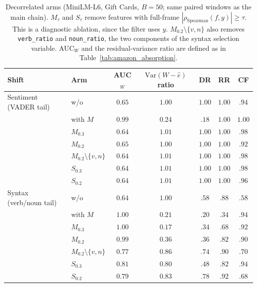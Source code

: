 \documentclass[11pt]{article}
\begin{document}
\begin{table}[ht]
\centering
\caption{Decorrelated arms (MiniLM-L6, Gift Cards, $B{=}50$; same paired windows as the main chain).
$M_\tau$ and $S_\tau$ remove features with full-frame $|\rho_{\mathrm{Spearman}}(f,y)|\ge\tau$.
This is a diagnostic ablation, since the filter uses $y$.
$M_{0.2}\setminus\{v,n\}$ also removes \texttt{verb\_ratio} and \texttt{noun\_ratio}, the two components of
the syntax selection variable. AUC$_W$ and the residual-variance ratio are defined as in
Table~\ref{tab:amazon_absorption}.}
\label{tab:amazon_decorr}
\begin{tabular}{llccccc}
\toprule
Shift & Arm & AUC$_W$ & $\mathrm{Var}(W-\hat e)$ ratio & DR & RR & CF \\
\midrule
Sentiment (VADER tail) & w/o & $0.65$ & $1.00$ & $\mathbf{1.00}$ & $\mathbf{1.00}$ & $\mathbf{.94}$ \\
 & with $M$ & $0.99$ & $0.24$ & $.18$ & $\mathbf{1.00}$ & $\mathbf{1.00}$ \\
 & $M_{0.3}$ & $0.64$ & $1.01$ & $\mathbf{1.00}$ & $\mathbf{1.00}$ & $\mathbf{.98}$ \\
 & $M_{0.2}$ & $0.65$ & $1.00$ & $\mathbf{1.00}$ & $\mathbf{1.00}$ & $\mathbf{.92}$ \\
 & $M_{0.2}\setminus\{v,n\}$ & $0.64$ & $1.01$ & $\mathbf{1.00}$ & $\mathbf{1.00}$ & $\mathbf{.98}$ \\
 & $S_{0.3}$ & $0.64$ & $1.01$ & $\mathbf{1.00}$ & $\mathbf{1.00}$ & $\mathbf{.98}$ \\
 & $S_{0.2}$ & $0.64$ & $1.01$ & $\mathbf{1.00}$ & $\mathbf{1.00}$ & $\mathbf{.96}$ \\
\midrule
Syntax (verb/noun tail) & w/o & $0.64$ & $1.00$ & $.58$ & $\mathbf{.88}$ & $.58$ \\
 & with $M$ & $1.00$ & $0.21$ & $.20$ & $.34$ & $\mathbf{.94}$ \\
 & $M_{0.3}$ & $1.00$ & $0.17$ & $.34$ & $.68$ & $\mathbf{.92}$ \\
 & $M_{0.2}$ & $0.99$ & $0.36$ & $.36$ & $\mathbf{.82}$ & $\mathbf{.90}$ \\
 & $M_{0.2}\setminus\{v,n\}$ & $0.77$ & $0.86$ & $.74$ & $\mathbf{.90}$ & $.70$ \\
 & $S_{0.3}$ & $0.81$ & $0.80$ & $.48$ & $\mathbf{.82}$ & $\mathbf{.94}$ \\
 & $S_{0.2}$ & $0.79$ & $0.83$ & $.78$ & $\mathbf{.92}$ & $.68$ \\
\bottomrule
\end{tabular}
\end{table}
\end{document}
